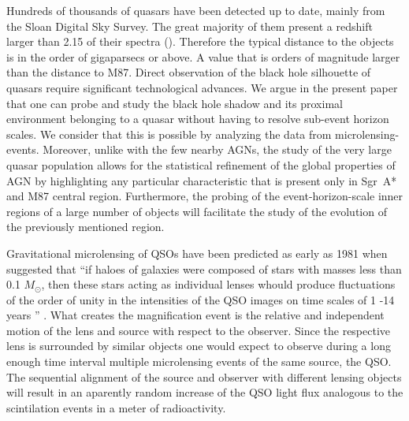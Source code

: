 Hundreds of thousands of quasars have been detected up to date, mainly from the Sloan Digital Sky Survey. The great majority of them present a redshift larger than 2.15 of their spectra (\citep{2014A&A...563A..54P}). 
Therefore the typical distance to the objects is in the order of gigaparsecs or above. 
A value that is orders of magnitude larger than the distance to M87. Direct observation of the black hole silhouette of quasars require significant technological advances.
We argue in the present paper that one can probe and study the black hole shadow and its proximal environment belonging to a quasar without having to resolve sub-event horizon scales. 
We consider that this is possible by analyzing the data from microlensing-events. 
Moreover, unlike with the few nearby AGNs, the study of the very large quasar population allows for the statistical refinement of the global properties of AGN by highlighting any particular
characteristic that is present only in Sgr~A* and M87 central region. 
Furthermore, the probing of the event-horizon-scale inner regions of a large number of objects will facilitate the study of the evolution of the previously mentioned region.     
     
Gravitational microlensing of QSOs have been predicted as early as 1981 when \cite{1981ApJ...243..140G} suggested that 
``if haloes of galaxies were composed of stars with masses less than  0.1 $M_\odot$, then these stars acting as individual lenses whould produce fluctuations of the order of 
unity in the intensities of the QSO images on time scales of 1 -14 years '' . 
What creates the magnification event is the relative and independent motion of the lens and source with respect to the observer.
Since the respective lens is surrounded by similar objects one would expect to observe during a long enough time interval
multiple microlensing events of the same source, the QSO. 
The sequential alignment of the source and observer with different lensing objects will result in an aparently random increase of the QSO light flux analogous to the scintilation events in a meter of radioactivity.

